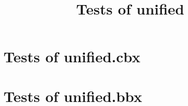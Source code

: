 \documentclass[a4paper,11pt]{article}
\title{Tests of unified}
\begin{document}
\maketitle

\section{Tests of unified.cbx}



\newpage

\section{Tests of unified.bbx}



\newpage
 
\printbibliography 
\end{document}

